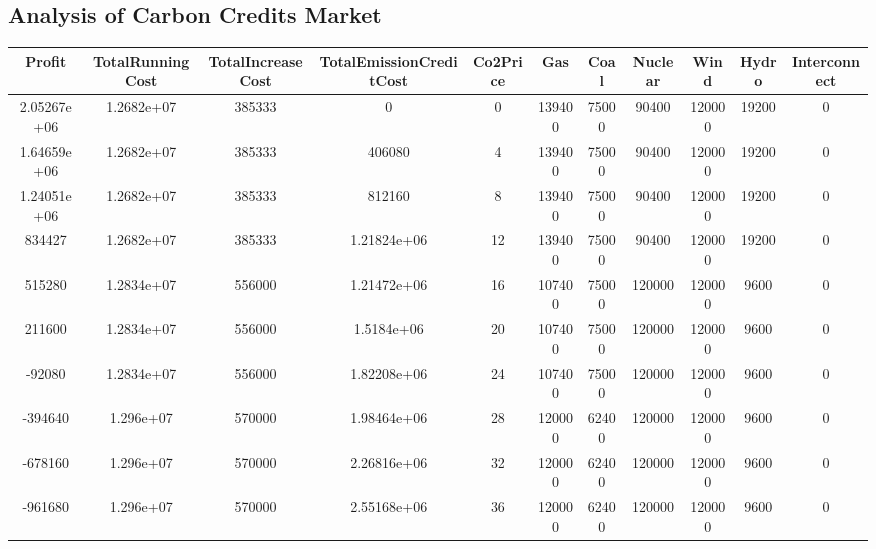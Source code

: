 \documentclass[twocolumn]{article}
\begin{document}
    
\begin{landscape}


    
    \section{Analysis of Carbon Credits Market}\label{sec:app-carbon}
    

    \begin{table}[H]
    	\centering
\begin{tabular}{ccccccccccc}
\hline
Profit       & TotalRunningCost & TotalIncreaseCost & TotalEmissionCreditCost & Co2Price & Gas    & Coal  & Nuclear & Wind   & Hydro & Interconnect \\ 
\hline
2.05267e+06  & 1.2682e+07       & 385333            & 0                       & 0        & 139400 & 75000 & 90400   & 120000 & 19200 & 0            \\
1.64659e+06  & 1.2682e+07       & 385333            & 406080                  & 4        & 139400 & 75000 & 90400   & 120000 & 19200 & 0            \\
1.24051e+06  & 1.2682e+07       & 385333            & 812160                  & 8        & 139400 & 75000 & 90400   & 120000 & 19200 & 0            \\
834427       & 1.2682e+07       & 385333            & 1.21824e+06             & 12       & 139400 & 75000 & 90400   & 120000 & 19200 & 0            \\
515280       & 1.2834e+07       & 556000            & 1.21472e+06             & 16       & 107400 & 75000 & 120000  & 120000 & 9600  & 0            \\
211600       & 1.2834e+07       & 556000            & 1.5184e+06              & 20       & 107400 & 75000 & 120000  & 120000 & 9600  & 0            \\
-92080       & 1.2834e+07       & 556000            & 1.82208e+06             & 24       & 107400 & 75000 & 120000  & 120000 & 9600  & 0            \\
-394640      & 1.296e+07        & 570000            & 1.98464e+06             & 28       & 120000 & 62400 & 120000  & 120000 & 9600  & 0            \\
-678160      & 1.296e+07        & 570000            & 2.26816e+06             & 32       & 120000 & 62400 & 120000  & 120000 & 9600  & 0            \\
-961680      & 1.296e+07        & 570000            & 2.55168e+06             & 36       & 120000 & 62400 & 120000  & 120000 & 9600  & 0            \\

\end{tabular}
\end{table}
\end{landscape}
\end{document}
